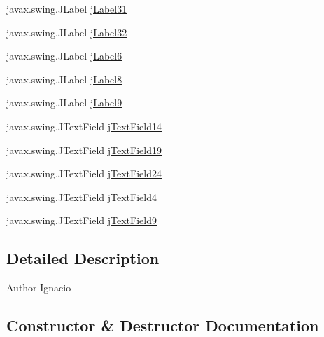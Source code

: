 \begin{DoxyCompactItemize}
\item 
javax.\+swing.\+J\+Label \mbox{\hyperlink{classinterfacessoguar_1_1paenrique_a9a9d32bd5f42fadfd293170415a4ebae}{j\+Label31}}
\item 
javax.\+swing.\+J\+Label \mbox{\hyperlink{classinterfacessoguar_1_1paenrique_a3b351505fc92b75748aed4174668f4c0}{j\+Label32}}
\item 
javax.\+swing.\+J\+Label \mbox{\hyperlink{classinterfacessoguar_1_1paenrique_aefb6dc4d3f0f469be0d03f9f4c7326bb}{j\+Label6}}
\item 
javax.\+swing.\+J\+Label \mbox{\hyperlink{classinterfacessoguar_1_1paenrique_ac20f17274561ba46a613d1f05c5bb218}{j\+Label8}}
\item 
javax.\+swing.\+J\+Label \mbox{\hyperlink{classinterfacessoguar_1_1paenrique_aeb67da672ddf8c985dec99dc697b750c}{j\+Label9}}
\item 
javax.\+swing.\+J\+Text\+Field \mbox{\hyperlink{classinterfacessoguar_1_1paenrique_aa8f99e5eec16f87bcbd493e159554332}{j\+Text\+Field14}}
\item 
javax.\+swing.\+J\+Text\+Field \mbox{\hyperlink{classinterfacessoguar_1_1paenrique_af87913542063bf9f8df4c2adeb0da744}{j\+Text\+Field19}}
\item 
javax.\+swing.\+J\+Text\+Field \mbox{\hyperlink{classinterfacessoguar_1_1paenrique_a7c88cab75dfa57f0ba92d8c84f8851d2}{j\+Text\+Field24}}
\item 
javax.\+swing.\+J\+Text\+Field \mbox{\hyperlink{classinterfacessoguar_1_1paenrique_a2302a6403a015e775096556c687e4fe1}{j\+Text\+Field4}}
\item 
javax.\+swing.\+J\+Text\+Field \mbox{\hyperlink{classinterfacessoguar_1_1paenrique_a381c34741919609d05e0045d816b5725}{j\+Text\+Field9}}
\end{DoxyCompactItemize}


\subsection{Detailed Description}
\begin{DoxyAuthor}{Author}
Ignacio 
\end{DoxyAuthor}


\subsection{Constructor \& Destructor Documentation}
\mbox{\label{classinterfacessoguar_1_1paenrique_aa7ddf4a74bfe7090389039f25ca3572a}} 
